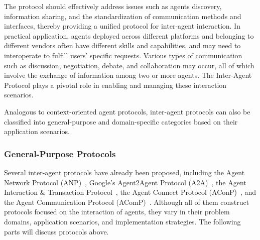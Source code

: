 \documentclass[10pt,preprint]{article}
\begin{document}
The protocol should effectively address issues such as agents discovery, information sharing, and the standardization of communication methods and interfaces, thereby providing a unified protocol for inter-agent interaction. In practical application, agents deployed across different platforms and belonging to different vendors often have different skills and capabilities, and may need to interoperate to fulfill users' specific requests. Various types of communication such as discussion, negotiation, debate, and collaboration may occur, all of which involve the exchange of information among two or more agents. The Inter-Agent Protocol plays a pivotal role in enabling and managing these interaction scenarios.


Analogous to context-oriented agent protocols, inter-agent protocols can also be classified into general-purpose and domain-specific categories based on their application scenarios.

\subsubsection{General-Purpose Protocols}

Several inter-agent protocols have already been proposed, including the Agent Network Protocol (ANP)~\citep{anp2024}, Google's Agent2Agent Protocol (A2A)~\citep{a2a2025}, the Agent Interaction \& Transaction Protocol~\citep{aitp}, the Agent Connect Protocol (AConP)~\citep{agentconnectptl}, and the Agent Communication Protocol (AComP)~\citep{agentcommunicationptl}. Although all of them construct protocols focused on the interaction of agents, they vary in their problem domains, application scenarios, and implementation strategies. The following parts will discuss protocols above.
\end{document}
